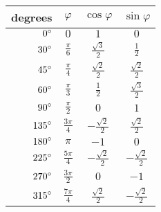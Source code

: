 \begin{tabular}{rccc}                                                               \toprule
degrees        & $\varphi$        & $\cos\varphi$         & $\sin\varphi$         \\\midrule
${0}^{\circ}$   & $0$              & $1$                   & $0$                   \\[6pt]
${30}^{\circ}$  & $\frac{\pi}{6}$  & $\frac{\sqrt{3}}{2}$  & $\frac{1}{2}$         \\[6pt]
${45}^{\circ}$  & $\frac{\pi}{4}$  & $\frac{\sqrt{2}}{2}$  & $\frac{\sqrt{2}}{2}$  \\[6pt]
${60}^{\circ}$  & $\frac{\pi}{3}$  & $\frac{1}{2}$         & $\frac{\sqrt{3}}{2}$  \\[6pt]
${90}^{\circ}$  & $\frac{\pi}{2}$  & $0$                   & $1$                   \\[6pt]
${135}^{\circ}$ & $\frac{3\pi}{4}$ & $-\frac{\sqrt{2}}{2}$ & $\frac{\sqrt{2}}{2}$  \\[6pt]
${180}^{\circ}$ & $\pi$            & $-1$                  & $0$                   \\[6pt]
${225}^{\circ}$ & $\frac{5\pi}{4}$ & $-\frac{\sqrt{2}}{2}$ & $-\frac{\sqrt{2}}{2}$ \\[6pt]
${270}^{\circ}$ & $\frac{3\pi}{2}$ & $0$                   & $-1$                  \\[6pt]
${315}^{\circ}$ & $\frac{7\pi}{4}$ & $\frac{\sqrt{2}}{2}$  & $-\frac{\sqrt{2}}{2}$ \\\bottomrule
\end{tabular}

